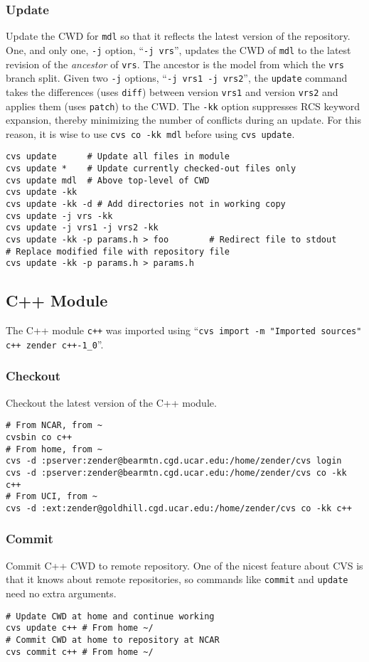 \documentclass[12pt,twoside]{article}
\begin{document}
\subsubsection[Update]{Update}
Update the CWD for \verb'mdl' so that it reflects the latest 
version of the repository. 
One, and only one, \verb'-j' option, ``\texttt{-j vrs}'', updates
the CWD of \verb'mdl' to the latest revision of the \textit{ancestor}
of \verb'vrs'.  
The ancestor is the model from which the \verb'vrs' branch split.
Given two \verb'-j' options, ``\texttt{-j vrs1 -j vrs2}'', 
the \verb'update' command takes the differences (uses \verb'diff')
between version \verb'vrs1' and version \verb'vrs2' and
applies them (uses \verb'patch') to the CWD.
The \verb'-kk' option suppresses RCS keyword expansion, thereby
minimizing the number of conflicts during an update.
For this reason, it is wise to use \texttt{cvs co -kk mdl}
before using \texttt{cvs update}.
\begin{verbatim}
cvs update      # Update all files in module
cvs update *    # Update currently checked-out files only
cvs update mdl  # Above top-level of CWD
cvs update -kk
cvs update -kk -d # Add directories not in working copy
cvs update -j vrs -kk
cvs update -j vrs1 -j vrs2 -kk
cvs update -kk -p params.h > foo        # Redirect file to stdout
# Replace modified file with repository file
cvs update -kk -p params.h > params.h   
\end{verbatim}

\subsection{C++ Module}\label{sxn:cvs_c++}
The C++ module \verb'c++' was imported using ``\texttt{cvs import -m
"Imported sources" c++ zender c++-1\_0}''. 

\subsubsection[Checkout]{Checkout}
Checkout the latest version of the C++ module. 
\begin{verbatim}
# From NCAR, from ~
cvsbin co c++
# From home, from ~
cvs -d :pserver:zender@bearmtn.cgd.ucar.edu:/home/zender/cvs login
cvs -d :pserver:zender@bearmtn.cgd.ucar.edu:/home/zender/cvs co -kk c++
# From UCI, from ~
cvs -d :ext:zender@goldhill.cgd.ucar.edu:/home/zender/cvs co -kk c++
\end{verbatim}

\subsubsection[Commit]{Commit}
Commit C++ CWD to remote repository.
One of the nicest feature about CVS is that it knows about remote
repositories, so commands like \verb'commit' and \verb'update' need no
extra arguments.
\begin{verbatim}
# Update CWD at home and continue working
cvs update c++ # From home ~/
# Commit CWD at home to repository at NCAR
cvs commit c++ # From home ~/
\end{verbatim}
\end{document}
